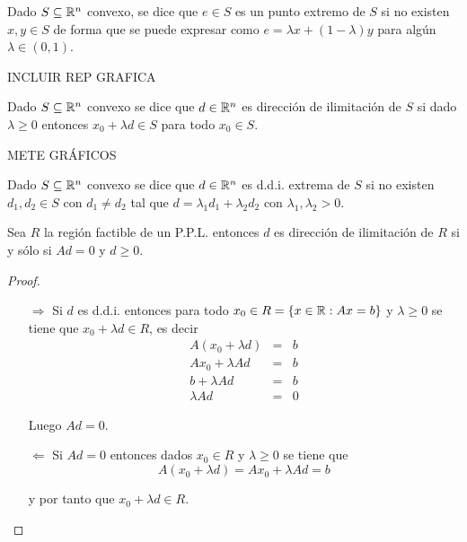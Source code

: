 \begin{definicion}
  Dado $S\subseteq \mathbb R^n$ convexo, se dice que $e\in S$ es un punto extremo de $S$ si no existen $x,y\in S $ de forma que se puede expresar como $e=\lambda x+(1-\lambda)y$ para algún $\lambda\in(0,1)$.
  
  INCLUIR REP GRAFICA
\end{definicion}


\begin{definicion}
  Dado $S\subseteq \mathbb R^n$ convexo se dice que $d\in\mathbb R^n$ es dirección de ilimitación de $S$ si dado $\lambda\ge0$ entonces $x_0+\lambda d\in S$ para todo $x_0\in S$.
\end{definicion}

\LARGE{METE GRÁFICOS}
\normalsize

\begin{definicion}
  Dado $S\subseteq \mathbb R^n$ convexo se dice que $d\in\mathbb R^n$ es d.d.i. extrema de $S$ si no existen $d_1,d_2\in S$ con $d_1\neq d_2$ tal que $d=\lambda_1d_1+\lambda_2 d_2$ con $\lambda_1,\lambda_2>0$.
\end{definicion}



\begin{proposicion}
  Sea $R$ la región factible de un P.P.L. entonces $d$ es dirección de ilimitación de $R$ si y sólo si $Ad=0$ y $d\ge0$.
\end{proposicion}

\begin{proof}
  \begin{enumerate}
    \item[$\Longrightarrow$] Si $d$ es d.d.i. entonces para todo $x_0\in R=\{x\in\mathbb R: Ax=b\}$ y $\lambda\ge0$ se tiene que $x_0+\lambda d\in R$, es decir
    \begin{eqnarray*}
      A(x_0+\lambda d) & = & b\\
      Ax_0 +\lambda Ad & = & b\\
      b + \lambda Ad & = & b\\
      \lambda Ad & = & 0
    \end{eqnarray*}
    
    Luego $Ad=0$.
    
    \item[$\Longleftarrow$] Si $Ad = 0 $ entonces dados $x_0\in R $ y $\lambda\ge0$ se tiene que 
    $$A(x_0+\lambda d)=Ax_0 +\lambda Ad=b$$
    
    y por tanto que $x_0+\lambda d\in R$.
  \end{enumerate}
\end{proof}


